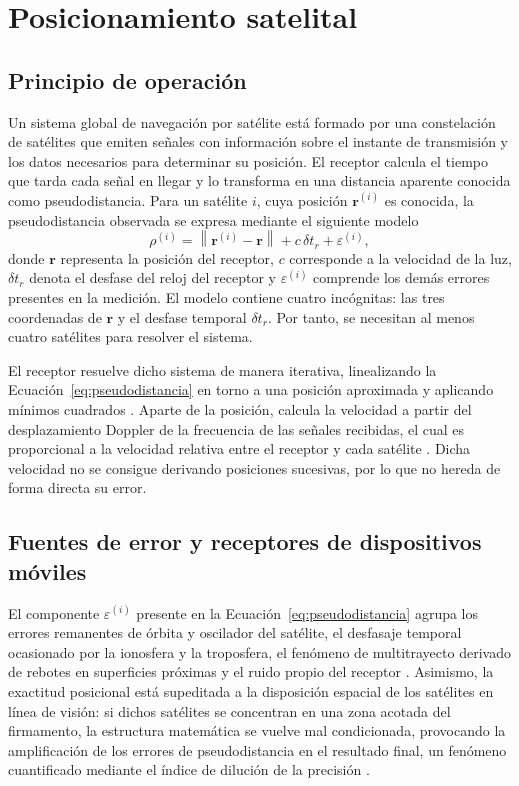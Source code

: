 \section{Posicionamiento satelital}
\label{sec:gnss}

\subsection{Principio de operación}

Un sistema global de navegación por satélite está formado por una constelación de satélites que emiten señales con información sobre el instante de transmisión y los datos necesarios para determinar su posición.
El receptor calcula el tiempo que tarda cada señal en llegar y lo transforma en una distancia aparente conocida como pseudodistancia.
Para un satélite $i$, cuya posición $\mathbf{r}^{(i)}$ es conocida, la pseudodistancia observada se expresa mediante el siguiente modelo \cite{groves2013gnss}
\begin{equation}
\rho^{(i)} = \left\| \mathbf{r}^{(i)} - \mathbf{r} \right\| + c\,\delta t_r + \varepsilon^{(i)},
\label{eq:pseudodistancia}
\end{equation}
donde $\mathbf{r}$ representa la posición del receptor, $c$ corresponde a la velocidad de la luz, $\delta t_r$ denota el desfase del reloj del receptor y $\varepsilon^{(i)}$ comprende los demás errores presentes en la medición.
El modelo contiene cuatro incógnitas: las tres coordenadas de $\mathbf{r}$ y el desfase temporal $\delta t_r$.
Por tanto, se necesitan al menos cuatro satélites para resolver el sistema.

El receptor resuelve dicho sistema de manera iterativa, linealizando la Ecuación~\eqref{eq:pseudodistancia} en torno a una posición aproximada y aplicando mínimos cuadrados \cite{groves2013gnss}.
Aparte de la posición, calcula la velocidad a partir del desplazamiento Doppler de la frecuencia de las señales recibidas, el cual es proporcional a la velocidad relativa entre el receptor y cada satélite \cite{groves2013gnss}.
Dicha velocidad no se consigue derivando posiciones sucesivas, por lo que no hereda de forma directa su error.

\subsection{Fuentes de error y receptores de dispositivos móviles}
\label{sec:gps-movil}

El componente $\varepsilon^{(i)}$ presente en la Ecuación~\eqref{eq:pseudodistancia} agrupa los errores remanentes de órbita y oscilador del satélite, el desfasaje temporal ocasionado por la ionosfera y la troposfera, el fenómeno de multitrayecto derivado de rebotes en superficies próximas y el ruido propio del receptor \cite{groves2013gnss}.
Asimismo, la exactitud posicional está supeditada a la disposición espacial de los satélites en línea de visión: si dichos satélites se concentran en una zona acotada del firmamento, la estructura matemática se vuelve mal condicionada, provocando la amplificación de los errores de pseudodistancia en el resultado final, un fenómeno cuantificado mediante el índice de dilución de la precisión \cite{groves2013gnss}.


